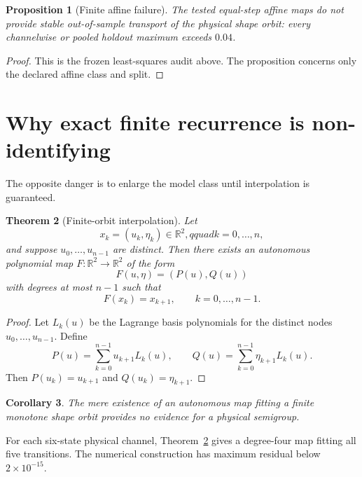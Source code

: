 \documentclass[12pt]{article}
\newtheorem{theorem}{Theorem}[section]\newtheorem{proposition}[theorem]{Proposition}
\newtheorem{corollary}[theorem]{Corollary}
\theoremstyle{remark}\newtheorem{remark}[theorem]{Remark}
\begin{document}
\begin{proposition}[Finite affine failure]\label{prop:affinefail}
The tested equal-step affine maps do not provide stable out-of-sample
transport of the physical shape orbit: every channelwise or pooled holdout
maximum exceeds $0.04$.
\end{proposition}
\begin{proof}
This is the frozen least-squares audit above.  The proposition concerns only
the declared affine class and split.
\end{proof}

\section{Why exact finite recurrence is non-identifying}

The opposite danger is to enlarge the model class until interpolation is
guaranteed.

\begin{theorem}[Finite-orbit interpolation]\label{thm:interpolation}
Let
\begin{equation}
 x_k=(u_k,\eta_k)\in\mathbb R^2,qquad k=0,\ldots,n,
\end{equation}
and suppose $u_0,\ldots,u_{n-1}$ are distinct.  Then there exists an
autonomous polynomial map $F:\mathbb R^2\to\mathbb R^2$ of the form
\begin{equation}
 F(u,\eta)=(P(u),Q(u))
\end{equation}
with degrees at most $n-1$ such that
\begin{equation}
 F(x_k)=x_{k+1},\qquad k=0,\ldots,n-1.
\end{equation}
\end{theorem}
\begin{proof}
Let $L_k(u)$ be the Lagrange basis polynomials for the distinct nodes
$u_0,\ldots,u_{n-1}$.  Define
\begin{equation}
 P(u)=\sum_{k=0}^{n-1}u_{k+1}L_k(u),
 \qquad
 Q(u)=\sum_{k=0}^{n-1}\eta_{k+1}L_k(u).
\end{equation}
Then $P(u_k)=u_{k+1}$ and $Q(u_k)=\eta_{k+1}$.
\end{proof}

\begin{corollary}\label{cor:noidentify}
The mere existence of an autonomous map fitting a finite monotone shape
orbit provides no evidence for a physical semigroup.
\end{corollary}

For each six-state physical channel, Theorem~\ref{thm:interpolation} gives a
degree-four map fitting all five transitions.  The numerical construction
has maximum residual below $2\times10^{-15}$.
\end{document}
